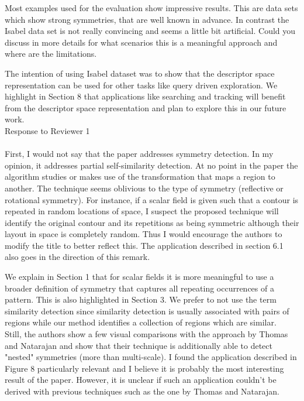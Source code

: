 \documentclass[10pt]{article}
\begin{document}
	
   Most examples used for the evaluation show impressive results. This are
   data sets which show strong symmetries, that are well known in advance.
   In contrast the Isabel data set is not really convincing and seems a
   little bit artificial. Could you discuss in more details for what
   scenarios this is a meaningful approach and where are the limitations.

   {\color{blue}The intention of using Isabel dataset was to show that the descriptor space representation
	   can be used for other tasks like query driven exploration. We highlight in Section 8
	   that applications like searching and tracking will benefit from the descriptor
   space representation and plan to explore this in our future work.}\\

{\noindent \LARGE Response to Reviewer 1}\\\\
   First, I would not say that the paper addresses symmetry detection. In my
   opinion, it addresses partial self-similarity detection. At no point in
   the paper the algorithm studies or makes use of the transformation that
   maps a region to another. The technique seems oblivious to the type of
   symmetry (reflective or rotational symmetry). For instance, if a scalar
   field is given such that a contour is repeated in random locations of
   space, I suspect the proposed technique will identify the original
   contour and its repetitions as being symmetric although their layout in
   space is completely random. Thus I would encourage the authors to modify
   the title to better reflect this. The application described in section
   6.1 also goes in the direction of this remark.

	
   {\color{blue}We explain in Section 1 that for scalar fields it is more
	   meaningful to use a broader definition of symmetry that captures
	   all repeating occurrences of a pattern. This is also highlighted in
	   Section 3. We prefer to not use the term similarity detection
	   since similarity detection is usually associated with pairs of regions
   	   while our method identifies a collection of regions which are similar.}\\

   Still, the authors show a few visual comparisons with the approach by
   Thomas and Natarajan and show that their technique is additionally able
   to detect "nested" symmetries (more than multi-scale).
   I found the application described in Figure 8 particularly relevant and I
   believe it is probably the most interesting result of the paper. However,
   it is unclear if such an application couldn't be derived with previous
   techniques such as the one by Thomas and Natarajan.
\end{document}
